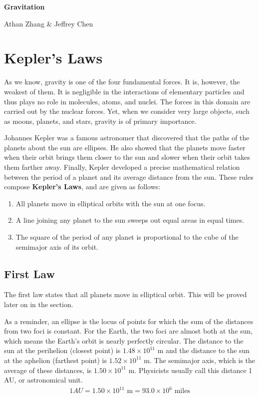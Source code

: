\documentclass[11pt]{article}
\begin{document}
\textbf{\Huge Gravitation}

Athan Zhang \& Jeffrey Chen

\section{Kepler's Laws}

As we know, gravity is one of the four fundamental forces. It is, however, the weakest of them. It is negligible in the interactions of elementary particles and thus plays no role in molecules, atoms, and nuclei. The forces in this domain are carried out by the nuclear forces. Yet, when we consider very large objects, such as moons, planets, and stars, gravity is of primary importance. 

Johannes Kepler was a famous astronomer that discovered that the paths of the planets about the sun are ellipses. He also showed that the planets move faster when their orbit brings them closer to the sun and slower when their orbit takes them farther away. Finally, Kepler developed a precise mathematical relation between the period of a planet and its average distance from the sun. These rules compose \textbf{Kepler's Laws}, and are given as follows:
\begin{enumerate}
    \item All planets move in elliptical orbits with the sun at one focus.
    \item A line joining any planet to the sun sweeps out equal areas in equal times.
    \item The square of the period of any planet is proportional to the cube of the semimajor axis of its orbit. 
\end{enumerate}

\subsection{First Law}

The first law states that all planets move in elliptical orbit. This will be proved later on in the section.

As a reminder, an ellipse is the locus of points for which the sum of the distances from two foci is constant. For the Earth, the two foci are almost both at the sun, which means the Earth's orbit is nearly perfectly circular. The distance to the sun at the perihelion (closest point) is $1.48\times10^{11}$ m and the distance to the sun at the aphelion (farthest point) is $1.52 \times 10^{11}$ m. The semimajor axis, which is the average of these distances, is $1.50 \times 10^{11}$ m. Physicists usually call this distance 1 AU, or astronomical unit.
\begin{align*}
    1 AU = 1.50 \times 10^{11} \text{ m} = 93.0 \times 10^{6} \text{ miles}
\end{align*}
\end{document}
